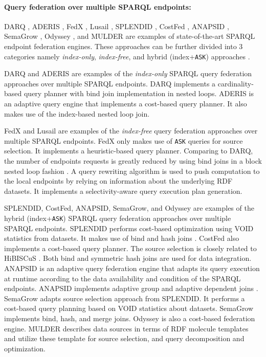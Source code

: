 \paragraph*{\textbf{Query federation over multiple SPARQL endpoints:}}

DARQ \cite{darq2008}, ADERIS \cite{aderis2011}, FedX \cite{fedx2011}, Lusail \cite{abdelaziz2017lusail}, SPLENDID \cite{splendid2011}, CostFed \cite{saleem2018costfed}, ANAPSID \cite{anapsid2011}, SemaGrow \cite{semagrow2015}, Odyssey \cite{odyssey2017}, and MULDER \cite{endris2018querying} are examples of state-of-the-art SPARQL endpoint federation engines. These approaches can be further divided into 3 categories namely \emph{index-only}, \emph{index-free}, and hybrid (index+\texttt{ASK}) approaches \cite{saleem2015fine}. 

DARQ and ADERIS are examples of the \emph{index-only} SPARQL query federation approaches over multiple SPARQL endpoints. DARQ implements a cardinality-based query planner with bind join implementation in nested loops. ADERIS is an adaptive query engine that implements a cost-based query planner. It also makes use of the index-based nested loop join. 

FedX and Lusail are examples of the \emph{index-free} query federation approaches over multiple SPARQL endpoints. 
FedX only makes use of \texttt{ASK} queries for source selection. It implements a heuristic-based query planner. Comparing to DARQ, the number of endpoints requests is greatly reduced by using bind joins in a block nested loop fashion \cite{fedx2011}. A query rewriting algorithm is used to
push computation to the local endpoints by relying on information about the underlying RDF datasets. It implements a selectivity-aware query execution plan generation. 

SPLENDID, CostFed, ANAPSID, SemaGrow, and Odyssey are examples of the hybrid (index+\texttt{ASK}) SPARQL query federation approaches over multiple SPARQL endpoints. SPLENDID performs cost-based optimization using VOID statistics from datasets. It makes use of bind and hash joins \cite{saleem2015fine}. %
CostFed also implements a cost-based query planner. The source selection is closely related to HiBISCuS \cite{hibiscus2014}. Both bind and symmetric hash joins are used for data integration. ANAPSID \cite{anapsid2011} is an adaptive query federation engine that adapts its query execution at runtime according to the data availability and condition of the SPARQL endpoints.  ANAPSID implements adaptive group and adaptive dependent joins \cite{saleem2015fine}. SemaGrow adapts source selection approach from SPLENDID. It performs a cost-based query planning based on VOID statistics about datasets. SemaGrow implements bind, hash, and merge joins. Odyssey is also a cost-based federation engine. MULDER describes data sources in terms of RDF molecule templates and utilize these template for source selection, and query decomposition and optimization.

